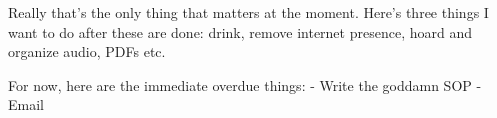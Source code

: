 \noindent {}

Really that's the only thing that matters at the moment. Here's three things I want to do after these are done: drink, remove internet presence, hoard and organize audio, PDFs etc.

For now, here are the immediate overdue things:
- Write the goddamn SOP
- Email 